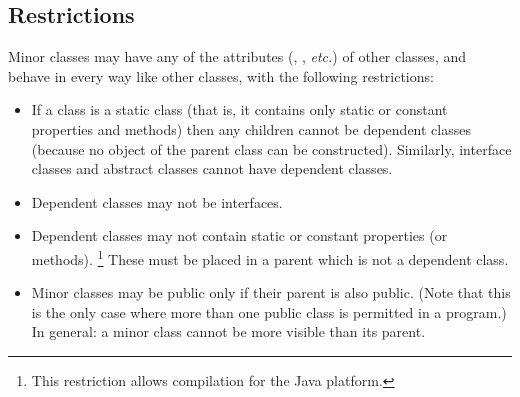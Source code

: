 \subsection{Restrictions}\label{refsminres}
 
Minor classes may have any of the attributes (,
, \emph{etc.}) of other classes, and behave in every way
like other classes, with the following restrictions:
\begin{itemize}
\item 
If a class is a static class (that is, it contains only static or
constant properties and methods) then any children cannot be dependent
classes (because no object of the parent class can be constructed).
Similarly, interface classes and abstract classes cannot have dependent
classes.
\item 
Dependent classes may not be interfaces.
\item 
{}
Dependent classes may not contain static or constant properties (or
methods).
\footnote{
This restriction allows compilation for the Java platform.
}
These must be placed in a parent which is not a dependent class.
\item 
Minor classes may be public only if their parent is also public.
(Note that this is the only case where more than one public class is
permitted in a program.)  In general: a minor class cannot be more
visible than its parent.
\end{itemize}
\index{,}
\index{,}
